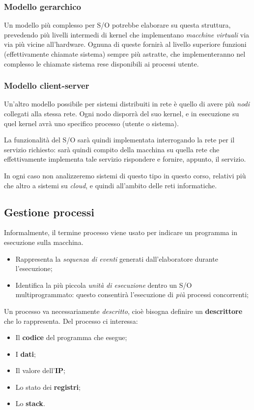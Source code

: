 \documentclass[a4paper,11pt]{article}
\begin{document}
\subsubsection{Modello gerarchico}
Un modello più complesso per S/O potrebbe elaborare su questa struttura, prevedendo più livelli intermedi di kernel che implementano \textit{macchine virtuali} via via più vicine all'hardware.
Ognuna di queste fornirà al livello superiore funzioni (effettivamente chiamate sistema) sempre più astratte, che implementeranno nel complesso le chiamate sistema rese disponibili ai processi utente.

\subsubsection{Modello client-server}
Un'altro modello possibile per sistemi distribuiti in rete è quello di avere più \textit{nodi} collegati alla stessa rete.
Ogni nodo disporrà del suo kernel, e in esecuzione su quel kernel avrà uno specifico processo (utente o sistema).

La funzionalità del S/O sarà quindi implementata interrogando la rete per il servizio richiesto: sarà quindi compito della macchina su quella rete che effettivamente implementa tale servizio rispondere e fornire, appunto, il servizio.

In ogni caso non analizzeremo sistemi di questo tipo in questo corso, relativi più che altro a sistemi su \textit{cloud}, e quindi all'ambito delle reti informatiche.

\subsection{Gestione processi}
Informalmente, il termine processo viene usato per indicare un programma in esecuzione sulla macchina.

\begin{itemize}
	\item Rappresenta la \textit{sequenza di eventi} generati dall'elaboratore durante l'esecuzione;
	\item Identifica la più piccola \textit{unità di esecuzione} dentro un S/O multiprogrammato: questo consentirà l'esecuzione di \textit{più} processi concorrenti;
\end{itemize}

Un processo va necessariamente \textit{descritto}, cioè bisogna definire un \textbf{descrittore} che lo rappresenta.
Del processo ci interessa:
\begin{itemize}
	\item Il \textbf{codice} del programma che esegue;
	\item I \textbf{dati};
	\item Il valore dell'\textbf{IP};
	\item Lo stato dei \textbf{registri};
	\item Lo \textbf{stack}.
\end{itemize}
\end{document}

